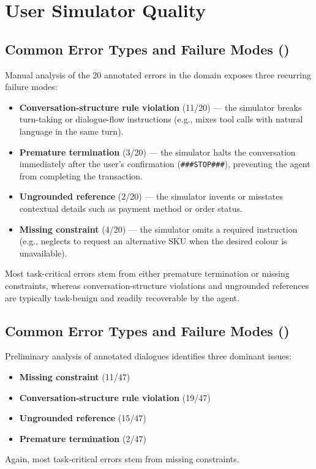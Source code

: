 \section{User Simulator Quality}
\label{app:user-sim-quality}

\subsection{Common Error Types and Failure Modes (\retail)}
Manual analysis of the 20 annotated errors in the \retail domain exposes three recurring failure modes:
\begin{itemize}
    \item \textbf{Conversation-structure rule violation} (11/20) --- the simulator breaks turn-taking or dialogue-flow instructions (e.g., mixes tool calls with natural language in the same turn).
    \item \textbf{Premature termination} (3/20) --- the simulator halts the conversation immediately after the user's confirmation (\texttt{\#\#\#STOP\#\#\#}), preventing the agent from completing the transaction.
    \item \textbf{Ungrounded reference} (2/20) --- the simulator invents or misstates contextual details such as payment method or order status.
    \item \textbf{Missing constraint} (4/20) --- the simulator omits a required instruction (e.g., neglects to request an alternative SKU when the desired colour is unavailable).
\end{itemize}
Most task-critical errors stem from either premature termination or missing constraints, whereas conversation-structure violations and ungrounded references are typically task-benign and readily recoverable by the agent.

\subsection{Common Error Types and Failure Modes (\airline)}
Preliminary analysis of annotated \airline dialogues identifies three dominant issues:
\begin{itemize}
    \item \textbf{Missing constraint} (11/47)
    \item \textbf{Conversation‑structure rule violation} (19/47)
    \item \textbf{Ungrounded reference} (15/47)
    \item \textbf{Premature termination} (2/47)
\end{itemize}
Again, most task‑critical errors stem from missing constraints. 


